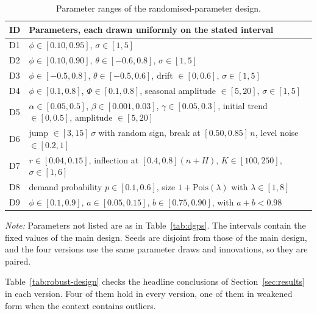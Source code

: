 \documentclass[11pt]{article}
\providecommand{\sectionref}[1]{Section~\ref{#1}}
\providecommand{\tableref}[1]{Table~\ref{#1}}
\begin{document}
\begin{table}[!htbp]
\centering
\begin{threeparttable}
\caption{Parameter ranges of the randomised-parameter design.}
\label{tab:ranges}
\small\setlength{\tabcolsep}{4pt}
\begin{tabular}{ll}
\toprule
ID & Parameters, each drawn uniformly on the stated interval \\
\midrule
D1 & $\phi \in [0.10, 0.95]$, $\sigma \in [1, 5]$ \\
D2 & $\phi \in [0.10, 0.90]$, $\theta \in [-0.6, 0.8]$, $\sigma \in [1, 5]$ \\
D3 & $\phi \in [-0.5, 0.8]$, $\theta \in [-0.5, 0.6]$, drift $\in [0, 0.6]$, $\sigma \in [1, 5]$ \\
D4 & $\phi \in [0.1, 0.8]$, $\Phi \in [0.1, 0.8]$, seasonal amplitude $\in [5, 20]$, $\sigma \in [1, 5]$ \\
D5 & $\alpha \in [0.05, 0.5]$, $\beta \in [0.001, 0.03]$, $\gamma \in [0.05, 0.3]$, initial trend $\in [0, 0.5]$, amplitude $\in [5, 20]$ \\
D6 & jump $\in [3, 15]\,\sigma$ with random sign, break at $[0.50, 0.85]\,n$, level noise $\in [0.2, 1]$ \\
D7 & $r \in [0.04, 0.15]$, inflection at $[0.4, 0.8](n + H)$, $K \in [100, 250]$, $\sigma \in [1, 6]$ \\
D8 & demand probability $p \in [0.1, 0.6]$, size $1 + \mathrm{Pois}(\lambda)$ with $\lambda \in [1, 8]$ \\
D9 & $\phi \in [0.1, 0.9]$, $a \in [0.05, 0.15]$, $b \in [0.75, 0.90]$, with $a + b < 0.98$ \\
\bottomrule
\end{tabular}
\begin{tablenotes}[flushleft]\footnotesize
\item \textit{Note:} Parameters not listed are as in \tableref{tab:dgps}. The intervals contain the
fixed values of the main design. Seeds are disjoint from those of the main design, and the four
versions use the same parameter draws and innovations, so they are paired.
\end{tablenotes}
\end{threeparttable}
\end{table}



\tableref{tab:robust-design} checks the headline conclusions of \sectionref{sec:results} in each
version. Four of them hold in every version, one of them in weakened form when the context
contains outliers.
\end{document}
